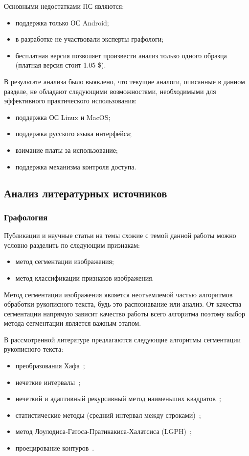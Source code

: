 Основными недостатками ПС являются:
\begin{itemize}
  \item поддержка только ОС Android;
  \item в разработке не участвовали эксперты графологи;
  \item бесплатная версия позволяет произвести анализ только одного образца (платная версия стоит 1.05 \$).
\end{itemize}

В результате анализа было выявлено, что текущие аналоги, описанные в данном разделе, не обладают следующими возможностями, необходимыми для эффективного практического использования:
\begin{itemize}
  \item поддержка ОС Linux и MacOS;
  \item поддержка русского языка интерфейса;
  \item взимание платы за использование;
  \item поддержка механизма контроля доступа.
\end{itemize}

\subsection{Анализ литературных источников}
\label{sub:domain:literary_sources}

\subsubsection{Графология}
Публикации и научные статьи на темы схожие с темой данной работы можно условно разделить по следующим признакам:
\begin{itemize}
  \item метод сегментации изображения;
  \item метод классификации признаков изображения.
\end{itemize}

Метод сегментации изображения является неотъемлемой частью алгоритмов обработки рукописного текста, будь это распознавание или анализ. От качества сегментации напрямую зависит качество работы всего алгоритма поэтому выбор метода сегментации является важным этапом.

В рассмотренной литературе предлагаются следующие алгоритмы сегментации рукописного текста:
\begin{itemize}
  \item преобразования Хафа~\cite{louloudis_gatos_pratikakis_halatsis};
  \item нечеткие интервалы~\cite{louloudis_gatos_pratikakis_halatsis};
  \item нечеткий и адаптивный рекурсивный метод наименьших \mbox{квадратов~\cite{louloudis_gatos_pratikakis_halatsis};}
  \item статистические методы (средний интервал между строками)~\cite{gomathi_umadevi_mohanavel};
  \item метод Лоулодиса-Гатоса-Пратикакиса-Халатсиса (LGPH)~\cite{louloudis_gatos_pratikakis_halatsis};
  \item проецирование контуров~\cite{louloudis_gatos_pratikakis_halatsis}.
\end{itemize}

